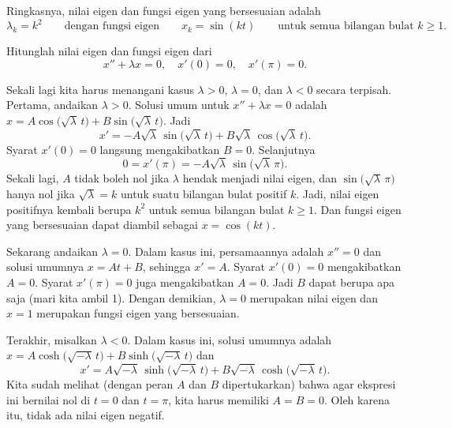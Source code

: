 \begin{example}
Ringkasnya, nilai eigen dan fungsi eigen yang bersesuaian adalah
\begin{equation*}
\lambda_k = k^2 \qquad \text{dengan fungsi eigen} \qquad x_k = \sin (k t)
\qquad \text{untuk semua bilangan bulat } k \geq 1 .
\end{equation*}
\end{example}

\begin{example}
Hitunglah nilai eigen dan fungsi eigen dari
\begin{equation*}
x'' + \lambda x = 0, \quad x'(0) = 0, \quad x'(\pi) = 0 .
\end{equation*}

Sekali lagi kita harus menangani kasus $\lambda > 0$, $\lambda = 0$, dan $\lambda
< 0$ secara terpisah.
Pertama, andaikan $\lambda > 0$.
Solusi umum untuk $x''+\lambda x = 0$ adalah
$x = A \cos \bigl( \sqrt{\lambda}\, t\bigr) + B \sin \bigl( \sqrt{\lambda}\,
t\bigr)$.
Jadi
\begin{equation*}
x' = -A\sqrt{\lambda}\, \sin \bigl( \sqrt{\lambda}\, t\bigr) +
B\sqrt{\lambda}\, \cos \bigl(\sqrt{\lambda}\, t\bigr) .
\end{equation*}
Syarat $x'(0) = 0$ langsung mengakibatkan $B = 0$.
Selanjutnya
\begin{equation*}
0 = x'(\pi) = -A\sqrt{\lambda}\, \sin \bigl( \sqrt{\lambda}\, \pi\bigr) .
\end{equation*}
Sekali lagi, $A$ tidak boleh nol jika $\lambda$ hendak menjadi nilai eigen,
dan $\sin \bigl( \sqrt{\lambda}\, \pi\bigr)$ hanya nol
jika
$\sqrt{\lambda} = k$ untuk suatu bilangan bulat positif $k$.
Jadi, nilai eigen positifnya kembali berupa
$k^2$ untuk semua bilangan bulat $k \geq 1$.  Dan fungsi eigen yang bersesuaian
dapat diambil sebagai $x=\cos (k t)$.

Sekarang andaikan $\lambda = 0$.  Dalam kasus ini, persamaannya adalah $x'' = 0$
dan solusi umumnya $x = At + B$, sehingga $x' = A$.  Syarat
$x'(0) = 0$ mengakibatkan
$A=0$.  Syarat $x'(\pi) = 0$ juga mengakibatkan $A=0$.
Jadi $B$ dapat berupa apa saja (mari kita ambil 1).  Dengan demikian, $\lambda = 0$
merupakan nilai eigen dan $x=1$ merupakan fungsi eigen yang bersesuaian.

Terakhir, misalkan $\lambda < 0$.  Dalam kasus ini, solusi umumnya adalah
$x = A \cosh \bigl( \sqrt{-\lambda}\, t\bigr)
+ B \sinh \bigl( \sqrt{-\lambda}\, t\bigr)$
dan
\begin{equation*}
x' = A\sqrt{-\lambda}\, \sinh \bigl( \sqrt{-\lambda}\, t\bigr)
+ B\sqrt{-\lambda}\, \cosh \bigl( \sqrt{-\lambda}\, t \bigr) .
\end{equation*}
Kita sudah melihat (dengan peran $A$ dan $B$ dipertukarkan) bahwa agar ekspresi ini
bernilai nol di $t=0$ dan $t=\pi$, kita harus memiliki $A=B=0$.
Oleh karena itu, tidak ada
nilai eigen negatif.


\end{example}
